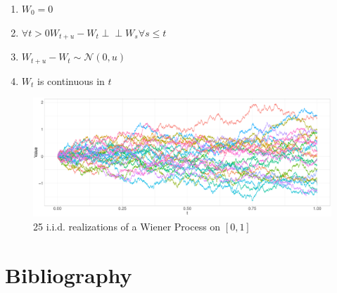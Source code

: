 \documentclass[11pt,twoside,a4paper]{article}
\begin{document}
	\begin{multicols}{2}
		\begin{enumerate}
			\item $W_0 = 0$
			\item $\forall t > 0 W_{t+u} - W_t \perp\!\!\!\perp W_s \forall s \leq t$
			\item $W_{t+u} - W_t \sim \mathcal{N}(0,u)$
			\item $W_t$ is continuous in $t$
		\end{enumerate}
	\end{multicols}

	\begin{figure}[H]\label{Wiener_plot}
		\includegraphics[width = \textwidth]{../Graphics/Wiener_plot.pdf}
		\caption{25 i.i.d. realizations of a Wiener Process on $[0,1]$}
	\end{figure}

	\newpage
	
	\section{Bibliography}
	\printbibliography[heading=none]	
	
\end{document}
